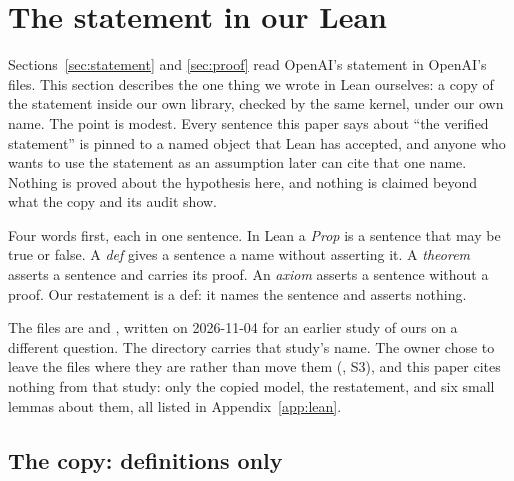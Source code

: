 \section{The statement in our Lean}
\label{sec:lean}
\begingroup\sloppy

Sections~\ref{sec:statement} and \ref{sec:proof} read OpenAI's statement
in OpenAI's files. This section describes the one thing we wrote in Lean
ourselves: a copy of the statement inside our own library, checked by
the same kernel, under our own name. The point is modest. Every sentence
this paper says about ``the verified statement'' is pinned to a named
object that Lean has accepted, and anyone who wants to use the statement
as an assumption later can cite that one name. Nothing is proved about
the hypothesis here, and nothing is claimed beyond what the copy and its
audit show.

Four words first, each in one sentence. In Lean a \emph{Prop} is a
sentence that may be true or false. A \emph{def} gives a sentence a name
without asserting it. A \emph{theorem} asserts a sentence and carries its
proof. An \emph{axiom} asserts a sentence without a proof. Our
restatement is a def: it names the sentence and asserts nothing.

The files are 
and , written
on 2026-11-04 for an earlier study of ours on a different question. The
directory carries that study's name. The owner chose to leave the files
where they are rather than move them (,
S3), and this paper cites nothing from that study: only the copied
model, the restatement, and six small lemmas about them, all listed in
Appendix~\ref{app:lean}.

\subsection{The copy: definitions only}
\label{sec:lean-copy}

